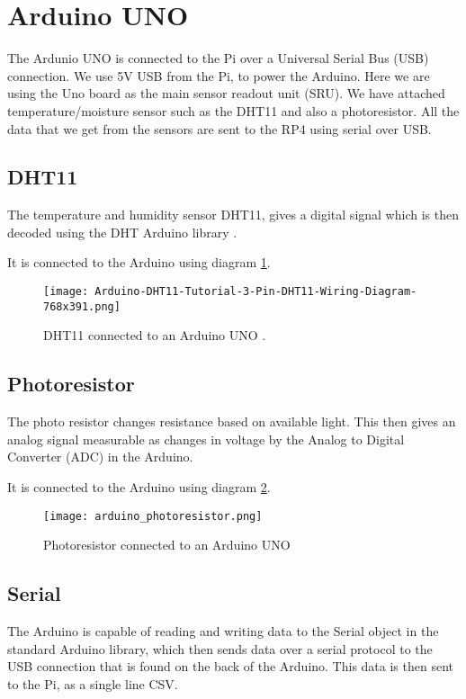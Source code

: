 \documentclass[a4paper,12pt,twoside,openright,titlepage]{book}
\begin{document}
\section{Arduino UNO}
The Ardunio UNO is connected to the Pi over a Universal Serial Bus (USB) connection.
We use 5V USB from the Pi, to power the Arduino. Here we are using the Uno board as the main sensor readout unit (SRU). We have attached temperature/moisture sensor such as the DHT11 and also a photoresistor. All the data that we get from the sensors are sent to the RP4 using serial over USB.

\subsection{DHT11}
The temperature and humidity sensor DHT11, gives a digital signal which is then decoded using the DHT Arduino library \cite{dht}.

It is connected to the Arduino using diagram \ref{diagram1}.

\begin{figure}[h]
    \texttt{[image: Arduino-DHT11-Tutorial-3-Pin-DHT11-Wiring-Diagram-768x391.png]}
    \caption{DHT11 connected to an Arduino UNO \cite{dht}.}
    \label{diagram1}
\end{figure}

\subsection{Photoresistor}
The photo resistor changes resistance based on available light.
This then gives an analog signal measurable as changes in voltage by the Analog to Digital Converter (ADC) in the Arduino.

It is connected to the Arduino using diagram \ref{diagram2}.

\begin{figure}[h]
    \texttt{[image: arduino\_photoresistor.png]}
    \caption{Photoresistor connected to an Arduino UNO \cite{photoresistor_arduino}}
    \label{diagram2}
\end{figure}

\subsection{Serial}
The Arduino is capable of reading and writing data to the Serial object in the standard Arduino library, which then sends data over a serial protocol to the USB connection that is found on the back of the Arduino.
This data is then sent to the Pi, as a single line CSV.
\end{document}
